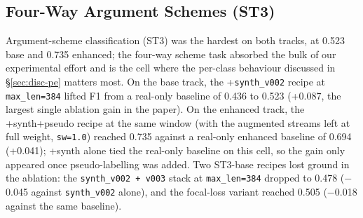 \subsection{Four-Way Argument Schemes (ST3)}
\label{sec:results-st3}

Argument-scheme classification (ST3) was the hardest on both tracks, at 0.523 base and 0.735 enhanced; the four-way scheme task absorbed the bulk of our experimental effort and is the cell where the per-class behaviour discussed in \S\ref{sec:disc-pe} matters most. On the base track, the +\texttt{synth\_v002} recipe at \texttt{max\_len=384} lifted F1 from a real-only baseline of 0.436 to 0.523 (+0.087, the largest single ablation gain in the paper). %
On the enhanced track, the +synth+pseudo recipe at the same window (with the augmented streams left at full weight, \texttt{sw=1.0}) reached 0.735 against a real-only enhanced baseline of 0.694 (+0.041); +synth alone tied the real-only baseline on this cell, so the gain only appeared once pseudo-labelling was added. %
Two ST3-base recipes lost ground in the ablation: the \texttt{synth\_v002 + v003} stack at \texttt{max\_len=384} dropped to 0.478 ($-$0.045 against \texttt{synth\_v002} alone), and the focal-loss variant reached 0.505 ($-$0.018 against the same baseline). %

